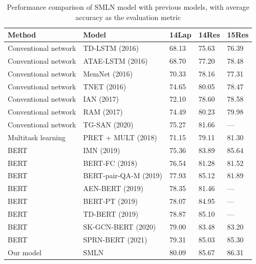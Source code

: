 \documentclass{article}
\begin{document}
\begin{table}[h]
\centering
\begin{tabular}{|l|l|l|l|l|}
\hline
Method & Model & 14Lap & 14Res & 15Res \\ \hline
Conventional network & TD-LSTM (2016) & 68.13 & 75.63 & 76.39 \\ \hline
Conventional network & ATAE-LSTM (2016) & 68.70 & 77.20 & 78.48 \\ \hline
Conventional network & MemNet (2016) & 70.33 & 78.16 & 77.31 \\ \hline
Conventional network & TNET (2016) & 74.65 & 80.05 & 78.47 \\ \hline
Conventional network & IAN (2017) & 72.10 & 78.60 & 78.58 \\ \hline
Conventional network & RAM (2017) & 74.49 & 80.23 & 79.98 \\ \hline
Conventional network & TG-SAN (2020) & 75.27 & 81.66 & — \\ \hline
Multitask learning & PRET + MULT (2018) & 71.15 & 79.11 & 81.30 \\ \hline
BERT & IMN (2019) & 75.36 & 83.89 & 85.64 \\ \hline
BERT & BERT-FC (2018) & 76.54 & 81.28 & 81.52 \\ \hline
BERT & BERT-pair-QA-M (2019) & 77.93 & 85.12 & 81.89 \\ \hline
BERT & AEN-BERT (2019) & 78.35 & 81.46 & — \\ \hline
BERT & BERT-PT (2019) & 78.07 & 84.95 & — \\ \hline
BERT & TD-BERT (2019) & 78.87 & 85.10 & — \\ \hline
BERT & SK-GCN-BERT (2020) & 79.00 & 83.48 & 83.20 \\ \hline
BERT & SPRN-BERT (2021) & 79.31 & 85.03 & 85.30 \\ \hline
Our model & SMLN & 80.09 & 85.67 & 86.31 \\ \hline
\end{tabular}
\caption{Performance comparison of SMLN model with previous models, with average accuracy as the evaluation metric}
\label{tab:my_label}
\cite{Yao2021MultitaskLF}
\end{table}
\end{document}
